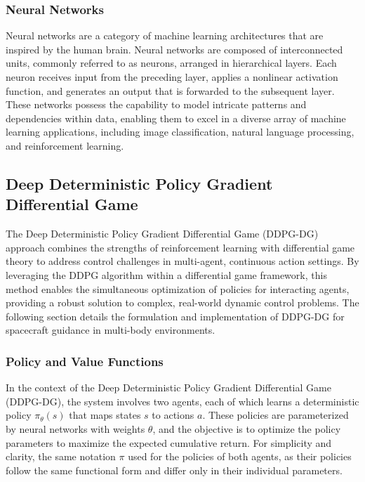 \documentclass[conference]{IEEEtran}
\begin{document}
\subsubsection{Neural Networks}
Neural networks are a category of machine learning architectures that are inspired by the human brain. 
Neural networks are composed of interconnected units, commonly referred to as neurons, arranged in hierarchical layers. Each neuron receives input from the preceding layer, applies a nonlinear activation function, and generates an output that is forwarded to the subsequent layer. These networks possess the capability to model intricate patterns and dependencies within data, enabling them to excel in a diverse array of machine learning applications, including image classification, natural language processing, and reinforcement learning.



\subsection{Deep Deterministic Policy Gradient Differential Game}
The Deep Deterministic Policy Gradient Differential Game (DDPG-DG) approach combines the strengths of reinforcement learning with differential game theory to address control challenges in multi-agent, continuous action settings. By leveraging the DDPG algorithm within a differential game framework, this method enables the simultaneous optimization of policies for interacting agents, providing a robust solution to complex, real-world dynamic control problems. The following section details the formulation and implementation of DDPG-DG for spacecraft guidance in multi-body environments.


\subsubsection{Policy and Value Functions}

In the context of the Deep Deterministic Policy Gradient Differential Game (DDPG-DG), the system involves two agents, each of which learns a deterministic policy \( \pi_{\theta}(s) \) that maps states \( s \) to actions \( a \). These policies are parameterized by neural networks with weights \( \theta \), and the objective is to optimize the policy parameters to maximize the expected cumulative return. For simplicity and clarity, the same notation \( \pi \) used for the policies of both agents, as their policies follow the same functional form and differ only in their individual parameters.
\end{document}
